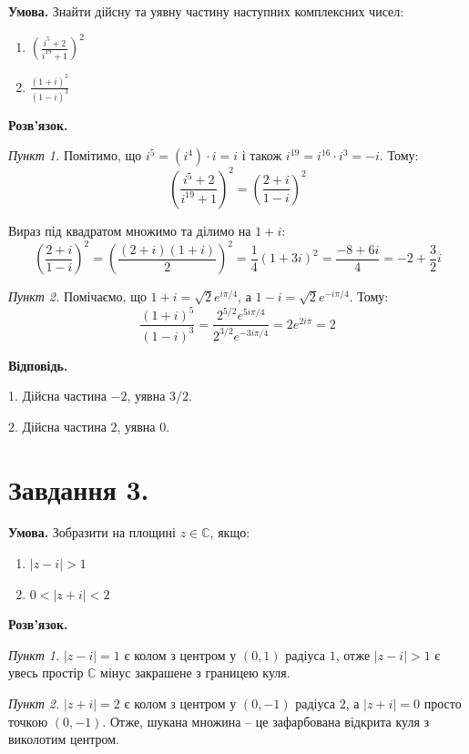 \documentclass[12pt]{extarticle}
\begin{document}
\textbf{Умова.} Знайти дійсну та уявну частину наступних комплексних чисел:
\begin{enumerate}
    \item $\left(\frac{i^5+2}{i^{19}+1}\right)^2$
    \item $\frac{(1+i)^5}{(1-i)^3}$
\end{enumerate}

\textbf{Розв'язок.} 

\textit{Пункт 1.} Помітимо, що $i^5=(i^4)\cdot i = i$ і також $i^{19}=i^{16} \cdot i^3 = -i$. Тому:
\[
\left(\frac{i^5+2}{i^{19}+1}\right)^2 = \left(\frac{2+i}{1-i}\right)^2
\]

Вираз під квадратом множимо та ділимо на $1+i$:
\[
\left(\frac{2+i}{1-i}\right)^2 = \left(\frac{(2+i)(1+i)}{2}\right)^2 = \frac{1}{4}(1+3i)^2 = \frac{-8+6i}{4} = -2 + \frac{3}{2}i
\]

\textit{Пункт 2.} Помічаємо, що $1+i=\sqrt{2}e^{i\pi/4}$, а $1-i=\sqrt{2}e^{-i\pi /4 }$. Тому:
\[
\frac{(1+i)^5}{(1-i)^{3}} = \frac{2^{5/2}e^{5i\pi/4}}{2^{3/2}e^{-3i\pi/4}} = 2 e^{2i\pi} = 2
\]

\textbf{Відповідь.} 

1. Дійсна частина $-2$, уявна $3/2$.

2. Дійсна частина $2$, уявна $0$.

\section*{Завдання 3.}

\textbf{Умова.} Зобразити на площині $z \in \mathbb{C}$, якщо:

\begin{enumerate}
    \item $|z-i| > 1$
    \item $0 < |z+i| < 2$
\end{enumerate}

\textbf{Розв'язок.} 

\textit{Пункт 1.} $|z-i|=1$ є колом з центром у $(0,1)$ радіуса $1$, отже $|z-i|>1$ є увесь простір $\mathbb{C}$ мінус закрашене з границею куля.

\textit{Пункт 2.} $|z+i|=2$ є колом з центром у $(0,-1)$ радіуса $2$, а $|z+i|=0$ просто точкою $(0,-1)$. Отже, шукана множина -- це зафарбована відкрита куля з виколотим центром.
\end{document}

